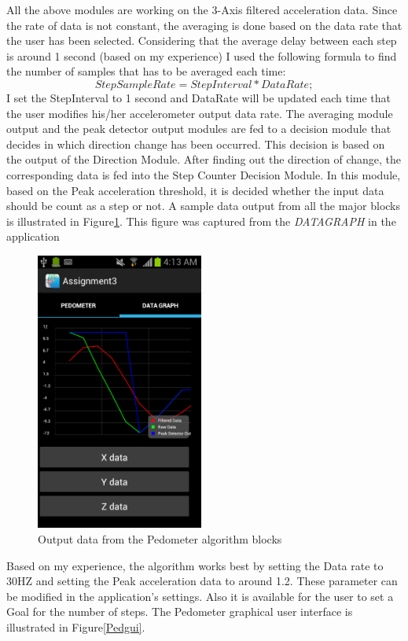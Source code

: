 \documentclass[conference]{IEEEtran}
\begin{document}
All the above modules are working on the 3-Axis filtered acceleration data. Since the rate of data is not constant, the averaging is done based on the data rate that the user has been selected. Considering that the average delay between each step is around 1 second (based on my experience) I used the following formula to find the number of samples that has to be averaged each time:
\begin{equation}\label{eq1}
StepSampleRate = StepInterval*DataRate;
\end{equation}
I set the StepInterval to 1 second and DataRate will be updated each time that the user modifies his/her accelerometer output data rate.
The averaging module output and the peak detector output modules are fed to a decision module that decides in which direction change has been occurred. This decision is based on the output of the Direction Module. After finding out the direction of change, the corresponding data is fed into the Step Counter Decision Module. In this module, based on the Peak acceleration threshold, it is decided whether the input data should be count as a step or not. A sample data output from all the major blocks is illustrated in Figure\ref{DataOut}. This figure was captured from the \emph{DATAGRAPH} in the application
\begin{figure}
\centering
\includegraphics[width=5.5cm]{DATAGRAPH.jpg}
\caption{\scriptsize  Output data from the Pedometer algorithm blocks}
\label{DataOut}
\end{figure}
Based on my experience, the algorithm works best by setting the Data rate to 30HZ and setting the Peak acceleration data to around 1.2. These parameter can be modified in the application's settings. Also it is available for the user to set a Goal for the number of steps. The Pedometer graphical user interface is illustrated in Figure\ref{Pedgui}.
\end{document}
